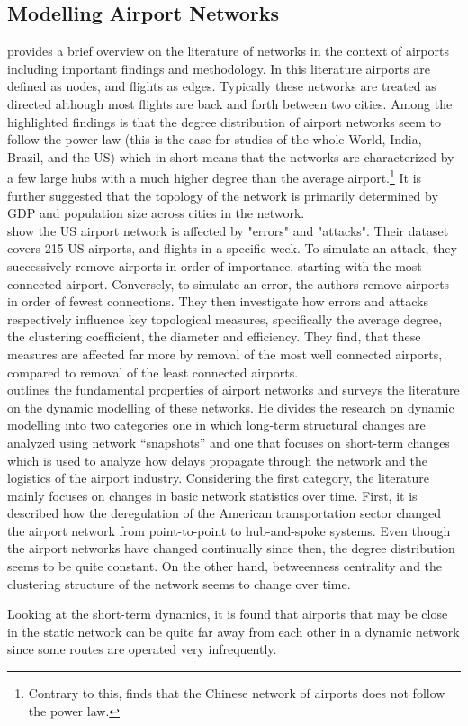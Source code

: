 \subsection{Modelling Airport Networks}
\citet[pp. 41-42]{costa2011analyzing} provides a brief overview on the literature of networks in the context of airports including important findings and methodology. In this literature airports are defined as nodes, and flights as edges. Typically these networks are treated as directed although most flights are back and forth between two cities. Among the highlighted findings is that the degree distribution of airport networks seem to follow the power law (this is the case for studies of the whole World, India, Brazil, and the US) which in short means that the networks are characterized by a few large hubs with a much higher degree than the average airport.\footnote{Contrary to this, \citet{he2004statistics} finds that the Chinese network of airports does not follow the power law.} It is further suggested that the topology of the network is primarily determined by GDP and population size across cities in the network.
\medskip\\
\citet{chi2004structural} show the US airport network is affected by "errors" and "attacks". Their dataset covers 215 US airports, and flights in a specific week. To simulate an attack, they successively remove airports in order of importance, starting with the most connected airport. Conversely, to simulate an error, the authors remove airports in order of fewest connections. They then investigate how errors and attacks respectively influence key topological measures, specifically the average degree, the clustering coefficient, the diameter and efficiency. They find, that these measures are affected far more by removal of the most well connected airports, compared to removal of the least connected airports.
\medskip\\
\citet{rocha2017dynamics} outlines the fundamental properties of airport networks and surveys the literature on the dynamic modelling of these networks. He divides the research on dynamic modelling into two categories one in which long-term structural changes are analyzed using network ``snapshots'' and one that focuses on short-term changes which is used to analyze how delays propagate through the network and the logistics of the airport industry. Considering the first category, the literature mainly focuses on changes in basic network statistics over time. First, it is described how the deregulation of the American transportation sector changed the airport network from point-to-point to hub-and-spoke systems. Even though the airport networks have changed continually since then, the degree distribution seems to be quite constant. On the other hand, betweenness centrality and the clustering structure of the network seems to change over time.
\par
Looking at the short-term dynamics, it is found that airports that may be close in the static network can be quite far away from each other in a dynamic network since some routes are operated very infrequently.  


